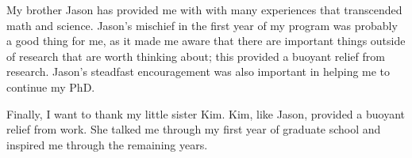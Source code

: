 My brother Jason has provided me with with many experiences that
transcended math and science.  Jason's mischief in the first year of
my program was probably a good thing for me, as it made me aware
that there are important things outside of research that are worth
thinking about; this provided a buoyant relief from research.  Jason's
steadfast encouragement was also important in helping me to continue
my PhD.

Finally, I want to thank my little sister Kim.  Kim, like Jason,
provided a buoyant relief from work.  She talked me through my first
year of graduate school and inspired me through the remaining years.
